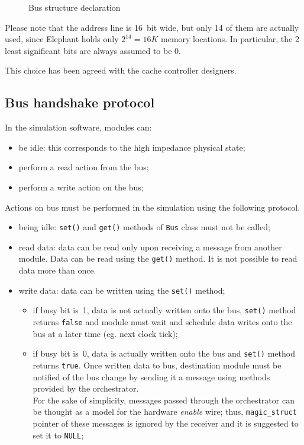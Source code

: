 \documentclass[a4paper,12pt]{article}
\newcommand{\memoryname}{Elephant}
\begin{document}
\begin{figure}

\caption{Bus structure declaration}
\label{src:bus-h}
\end{figure}

Please note that the address line is 16~bit wide, but only 14 of them are actually used, since \memoryname{} holds only $2^{14} = 16K$ memory locations.
In particular, the 2 least significant bits are always assumed to be 0.

This choice has been agreed with the cache controller designers.

\subsection{Bus handshake protocol}
In the simulation software, modules can:
\begin{itemize}
  \item be idle: this corresponds to the high impedance physical state;
  \item perform a read action from the bus;
  \item perform a write action on the bus;
\end{itemize}

Actions on bus must be performed in the simulation using the following protocol.

\begin{itemize}
  \item being idle: \texttt{set()} and \texttt{get()} methods of \texttt{Bus} class must not be called;
  \item read data: data can be read only upon receiving a message from another module. Data can be read using the \texttt{get()} method. It is not possible to read data more than once.
  \item write data: data can be written using the \texttt{set()} method;
  \begin{itemize}
    \item if busy bit is~1, data is not actually written onto the bus, \texttt{set()} method returns \texttt{false} and module must wait and schedule data writes onto the bus at a later time (eg. next clock tick);
    \item if busy bit is~0, data is actually written onto the bus and \texttt{set()} method returns \texttt{true}.
    Once written data to bus, destination module must be notified of the bus change by sending it a message using methods provided by the orchestrator.\\
    For the sake of simplicity, messages passed through the orchestrator can be thought as a model for the hardware \emph{enable} wire; thus, \texttt{magic\_struct} pointer of these messages is ignored by the receiver and it is suggested to set it to \texttt{NULL};
  \end{itemize}
\end{itemize}
\end{document}
